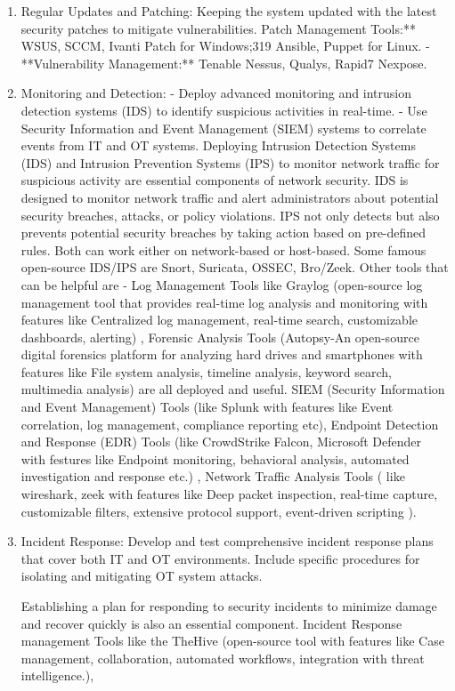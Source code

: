 \begin{enumerate}
    \item Regular Updates and Patching: Keeping the system updated with the latest security patches to mitigate vulnerabilities. Patch Management Tools:** WSUS, SCCM, Ivanti Patch for Windows;319
Ansible, Puppet for Linux. - **Vulnerability Management:** Tenable Nessus, Qualys, Rapid7 Nexpose.

    \item Monitoring and Detection:
   - Deploy advanced monitoring and intrusion detection systems (IDS) to identify suspicious activities in real-time.
   - Use Security Information and Event Management (SIEM) systems to correlate events from IT and OT systems. Deploying Intrusion Detection Systems (IDS) and Intrusion Prevention Systems (IPS) to monitor network traffic for suspicious activity are essential components of network security. IDS is designed to monitor network traffic and alert administrators about potential security breaches, attacks, or policy violations. IPS not only detects but also prevents potential security breaches by taking action based on pre-defined rules. Both can work either on network-based or host-based. Some famous open-source IDS/IPS are Snort, Suricata, OSSEC,  Bro/Zeek. Other tools that can be helpful are - Log Management Tools like Graylog (open-source log management tool that provides real-time log analysis and monitoring with features like Centralized log management, real-time search, customizable dashboards, alerting) , Forensic Analysis Tools (Autopsy-An open-source digital forensics platform for analyzing hard drives and smartphones with features like File system analysis, timeline analysis, keyword search, multimedia analysis) are all deployed and useful. SIEM (Security Information and Event Management) Tools (like Splunk with features like Event correlation, log management, compliance reporting etc), Endpoint Detection and Response (EDR) Tools  (like CrowdStrike Falcon, Microsoft Defender with festures like Endpoint monitoring, behavioral analysis, automated investigation and response etc.) , Network Traffic Analysis Tools ( like wireshark, zeek with features like  Deep packet inspection, real-time capture, customizable filters, extensive protocol support, event-driven scripting ). 

   \item  Incident Response: Develop and test comprehensive incident response plans that cover both IT and OT environments. Include specific procedures for isolating and mitigating OT system attacks.  
   
   Establishing a plan for responding to security incidents to minimize damage and recover quickly is also an essential component. Incident Response management Tools like the TheHive (open-source tool with features like Case management, collaboration, automated workflows, integration with threat intelligence.), 




\end{enumerate}
